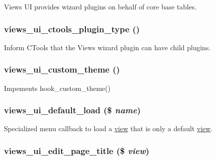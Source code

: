 Views UI provides wizard plugins on behalf of core base tables. \hypertarget{views__ui_8module_ae2a131b1e4c36d0e2777642eda6d78b0}{
\subsubsection[{views\_\-ui\_\-ctools\_\-plugin\_\-type}]{\setlength{\rightskip}{0pt plus 5cm}views\_\-ui\_\-ctools\_\-plugin\_\-type ()}}
\label{views__ui_8module_ae2a131b1e4c36d0e2777642eda6d78b0}
Inform CTools that the Views wizard plugin can have child plugins. \hypertarget{views__ui_8module_a9b0eb98e71715cf1d082f0b0c3f1121e}{
\subsubsection[{views\_\-ui\_\-custom\_\-theme}]{\setlength{\rightskip}{0pt plus 5cm}views\_\-ui\_\-custom\_\-theme ()}}
\label{views__ui_8module_a9b0eb98e71715cf1d082f0b0c3f1121e}
Impements hook\_\-custom\_\-theme() \hypertarget{views__ui_8module_a5457ed35c0e4b1764846ba4a0b74224f}{
\subsubsection[{views\_\-ui\_\-default\_\-load}]{\setlength{\rightskip}{0pt plus 5cm}views\_\-ui\_\-default\_\-load (\$ {\em name})}}
\label{views__ui_8module_a5457ed35c0e4b1764846ba4a0b74224f}
Specialized menu callback to load a \hyperlink{classview}{view} that is only a default \hyperlink{classview}{view}. \hypertarget{views__ui_8module_aac98d6c71b5ab337edf517fc59f2cddf}{
\subsubsection[{views\_\-ui\_\-edit\_\-page\_\-title}]{\setlength{\rightskip}{0pt plus 5cm}views\_\-ui\_\-edit\_\-page\_\-title (\$ {\em view})}}
